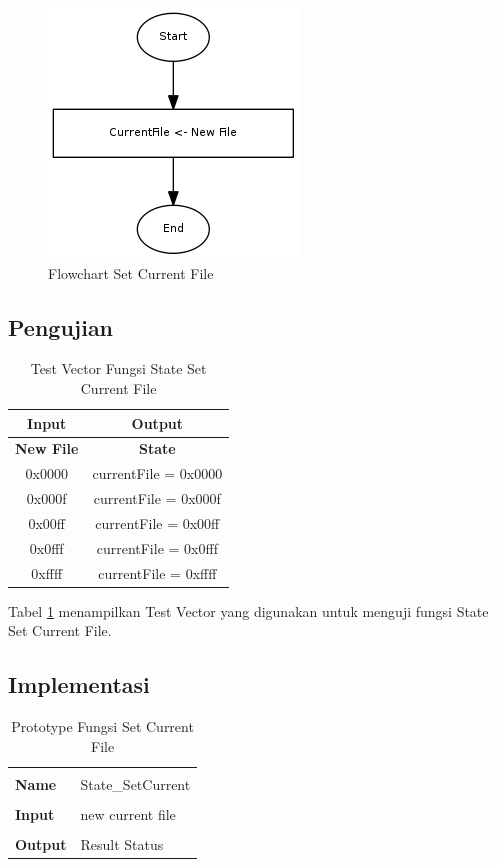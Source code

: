 \begin{figure}[h]
\centering
\includegraphics[height=0.25\textheight]{image/state/flow_setcurrentfile.png}
\caption{Flowchart Set Current File}
\label{fig-flow-setcurrentfile}
\end{figure}

\subsection {Pengujian}

\begin{table}[!h]
  \centering
  \begin{tabular}{ | c || c | }
    \hline
    \bf{Input} & \bf{Output} \\
    \hline
    \bf{New File} & \bf{State} \\
    \hline
    0x0000 & currentFile = 0x0000 \\
    \hline
    0x000f & currentFile = 0x000f \\
    \hline
    0x00ff & currentFile = 0x00ff \\
    \hline
    0x0fff & currentFile = 0x0fff \\
    \hline
    0xffff & currentFile = 0xffff \\
    \hline
  \end{tabular}
  \caption{Test Vector Fungsi State Set Current File}
  \label{tabel-test-setcurrentfile}
\end{table}

Tabel \ref{tabel-test-setcurrentfile} menampilkan Test Vector yang digunakan untuk menguji fungsi State Set Current File.

\subsection {Implementasi}

\begin{table}[h]
  \centering
  \begin{tabular}{p{2cm} p{8cm}}
    \hline\\
    {\bf Name} & State\_SetCurrent\\
    \hline\\
    {\bf Input} & new current file
    \\
    \hline\\
    {\bf Output} & Result Status
    \\
    \hline
  \end{tabular}
  \caption{Prototype Fungsi Set Current File}
  \label{tabel-setcurrentfile}
\end{table}

